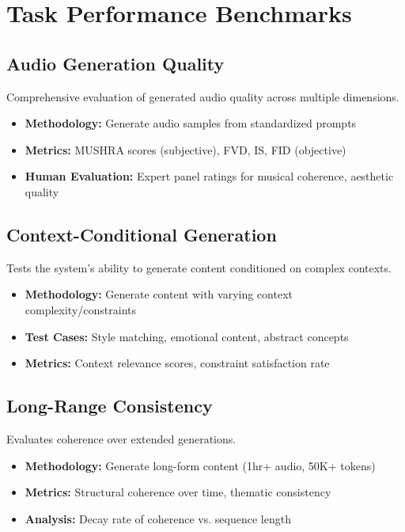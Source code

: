 \section{Task Performance Benchmarks}

\subsection{Audio Generation Quality}

Comprehensive evaluation of generated audio quality across multiple dimensions.

\begin{itemize}
    \item \textbf{Methodology:} Generate audio samples from standardized prompts
    \item \textbf{Metrics:} MUSHRA scores (subjective), FVD, IS, FID (objective)
    \item \textbf{Human Evaluation:} Expert panel ratings for musical coherence, aesthetic quality
\end{itemize}

\subsection{Context-Conditional Generation}

Tests the system's ability to generate content conditioned on complex contexts.

\begin{itemize}
    \item \textbf{Methodology:} Generate content with varying context complexity/constraints
    \item \textbf{Test Cases:} Style matching, emotional content, abstract concepts
    \item \textbf{Metrics:} Context relevance scores, constraint satisfaction rate
\end{itemize}

\subsection{Long-Range Consistency}

Evaluates coherence over extended generations.

\begin{itemize}
    \item \textbf{Methodology:} Generate long-form content (1hr+ audio, 50K+ tokens)
    \item \textbf{Metrics:} Structural coherence over time, thematic consistency
    \item \textbf{Analysis:} Decay rate of coherence vs. sequence length
\end{itemize}

